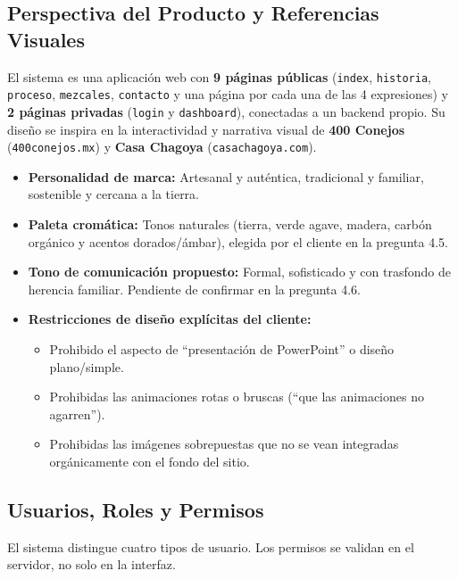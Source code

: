 \documentclass[11pt,letterpaper]{article}
\begin{document}
\subsection{Perspectiva del Producto y Referencias Visuales}
El sistema es una aplicación web con \textbf{9 páginas públicas} (\texttt{index}, \texttt{historia}, \texttt{proceso}, \texttt{mezcales}, \texttt{contacto} y una página por cada una de las 4 expresiones) y \textbf{2 páginas privadas} (\texttt{login} y \texttt{dashboard}), conectadas a un backend propio. Su diseño se inspira en la interactividad y narrativa visual de \textbf{400 Conejos} (\texttt{400conejos.mx}) y \textbf{Casa Chagoya} (\texttt{casachagoya.com}).
\begin{itemize}[leftmargin=1.5em]
    \item \textbf{Personalidad de marca:} Artesanal y auténtica, tradicional y familiar, sostenible y cercana a la tierra.
    \item \textbf{Paleta cromática:} Tonos naturales (tierra, verde agave, madera, carbón orgánico y acentos dorados/ámbar), elegida por el cliente en la pregunta 4.5.
    \item \textbf{Tono de comunicación propuesto:} Formal, sofisticado y con trasfondo de herencia familiar. Pendiente de confirmar en la pregunta 4.6.
    \item \textbf{Restricciones de diseño explícitas del cliente:}
    \begin{itemize}
        \item Prohibido el aspecto de ``presentación de PowerPoint'' o diseño plano/simple.
        \item Prohibidas las animaciones rotas o bruscas (``que las animaciones no agarren'').
        \item Prohibidas las imágenes sobrepuestas que no se vean integradas orgánicamente con el fondo del sitio.
    \end{itemize}
\end{itemize}

\subsection{Usuarios, Roles y Permisos}
El sistema distingue cuatro tipos de usuario. Los permisos se validan en el servidor, no solo en la interfaz.
\end{document}
